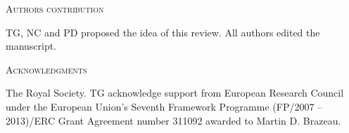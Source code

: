 \documentclass[12pt,letterpaper]{article}
\renewcommand{\section}[1]{%
\bigskip
\begin{center}
\begin{Large}
\normalfont\scshape #1
\medskip
\end{Large}
\end{center}}
\begin{document}




\section{Authors contribution}
TG, NC and PD proposed the idea of this review. All authors edited the manuscript.

\section{Acknowledgments}
The Royal Society.
TG acknowledge support from European Research Council under the European Union's Seventh Framework Programme (FP/2007 – 2013)/ERC Grant Agreement number 311092 awarded to Martin D. Brazeau.




\end{document}
